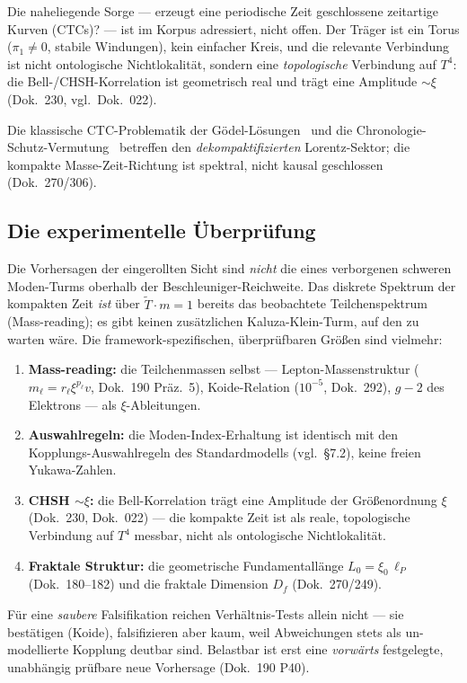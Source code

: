 \documentclass[11pt,a4paper]{article}
\begin{document}
Die naheliegende Sorge --- erzeugt eine periodische Zeit geschlossene zeitartige Kurven (CTCs)? --- ist im Korpus adressiert, nicht offen. Der Träger ist ein Torus ($\pi_1\neq0$, stabile Windungen), kein einfacher Kreis, und die relevante Verbindung ist nicht ontologische Nichtlokalität, sondern eine \emph{topologische} Verbindung auf $T^4$: die Bell-/CHSH-Korrelation ist geometrisch real und trägt eine Amplitude $\sim\xi$ (Dok.~230, vgl.\ Dok.~022).

Die klassische CTC-Problematik der Gödel-Lösungen~\cite{Goedel1949} und die Chronologie-Schutz-Vermutung~\cite{Hawking1992} betreffen den \emph{dekompaktifizierten} Lorentz-Sektor; die kompakte Masse-Zeit-Richtung ist spektral, nicht kausal geschlossen (Dok.~270/306).

\subsection{Die experimentelle Überprüfung}

Die Vorhersagen der eingerollten Sicht sind \emph{nicht} die eines verborgenen schweren Moden-Turms oberhalb der Beschleuniger-Reichweite. Das diskrete Spektrum der kompakten Zeit \emph{ist} über $\tilde{T}\cdot m = 1$ bereits das beobachtete Teilchenspektrum (Mass-reading); es gibt keinen zusätzlichen Kaluza-Klein-Turm, auf den zu warten wäre. Die framework-spezifischen, überprüfbaren Größen sind vielmehr:
\begin{enumerate}[leftmargin=1.6em,itemsep=0.2em]
  \item \textbf{Mass-reading:} die Teilchenmassen selbst --- Lepton-Massenstruktur ($m_\ell=r_\ell\xi^{p_\ell}v$, Dok.~190 Präz.~5), Koide-Relation ($10^{-5}$, Dok.~292), $g-2$ des Elektrons --- als $\xi$-Ableitungen.
  \item \textbf{Auswahlregeln:} die Moden-Index-Erhaltung ist identisch mit den Kopplungs-Auswahlregeln des Standardmodells (vgl.\ §7.2), keine freien Yukawa-Zahlen.
  \item \textbf{CHSH $\sim \xi$:} die Bell-Korrelation trägt eine Amplitude der Größenordnung $\xi$ (Dok.~230, Dok.~022) --- die kompakte Zeit ist als reale, topologische Verbindung auf $T^4$ messbar, nicht als ontologische Nichtlokalität.
  \item \textbf{Fraktale Struktur:} die geometrische Fundamentallänge $L_0 = \xi_0\,\ell_P$ (Dok.~180--182) und die fraktale Dimension $D_f$ (Dok.~270/249).
\end{enumerate}

Für eine \emph{saubere} Falsifikation reichen Verhältnis-Tests allein nicht --- sie bestätigen (Koide), falsifizieren aber kaum, weil Abweichungen stets als un-modellierte Kopplung deutbar sind. Belastbar ist erst eine \emph{vorwärts} festgelegte, unabhängig prüfbare neue Vorhersage (Dok.~190 P40).
\end{document}

